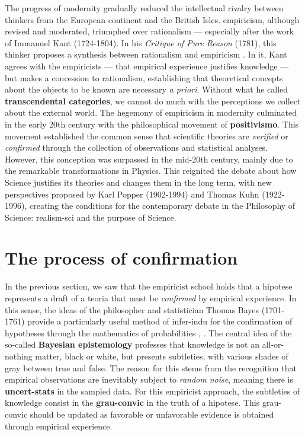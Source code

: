 \documentclass[./main_en.tex]{subfiles}
\begin{document}
\par The progress of modernity gradually reduced the intellectual rivalry between thinkers from the European continent and the British Isles. \gls{empiricism}, although revised and moderated, triumphed over \gls{rationalism} — especially after the work of Immanuel Kant (1724-1804). In his \textit{Critique of Pure Reason} (1781), this thinker proposes a synthesis between \gls{rationalism} and \gls{empiricism} \cite{silveira2002, weiss2017}. In it, Kant agrees with the empiricists — that empirical experience justifies knowledge — but makes a concession to \gls{rationalism}, establishing that theoretical concepts about the objects to be known are necessary \textit{a priori}. Without what he called \textbf{transcendental categories}, we cannot do much with the perceptions we collect about the external world. The hegemony of \gls{empiricism} in modernity culminated in the early 20th century with the philosophical movement of \textbf{\gls{positivismo}}. This movement established the common sense that scientific theories are \textit{verified} or \textit{confirmed} through the collection of observations and statistical analyses. However, this conception was surpassed in the mid-20th century, mainly due to the remarkable transformations in Physics. This reignited the debate about how Science justifies its theories and changes them in the long term, with new perspectives proposed by Karl Popper (1902-1994) and Thomas Kuhn (1922-1996), creating the conditions for the contemporary debate in the Philosophy of Science: \gls{realism-sci} and the purpose of Science.

\section{The process of confirmation} \label{sec:epis:bayes}

\par In the previous section, we saw that the empiricist school holds that a \gls{hipotese} represents a draft of a \gls{teoria} that must be \textit{confirmed} by empirical experience. In this sense, the ideas of the philosopher and statistician Thomas Bayes (1701-1761) provide a particularly useful method of \gls{infer-indu} for the confirmation of hypotheses through the mathematics of probabilities \cite{sep-epistemology-bayesian}, \cite{sprenger2019}. The central idea of the so-called \textbf{Bayesian epistemology} professes that knowledge is not an all-or-nothing matter, black or white, but presents subtleties, with various shades of gray between true and false. The reason for this stems from the recognition that empirical observations are inevitably subject to \textit{random noise}, meaning there is \textbf{\gls{uncert-stats}} in the sampled data. For this empiricist approach, the subtleties of knowledge consist in the \textbf{\gls{grau-convic}} in the truth of a \gls{hipotese}. This \gls{grau-convic} should be updated as favorable or unfavorable evidence is obtained through empirical experience.
\end{document}
